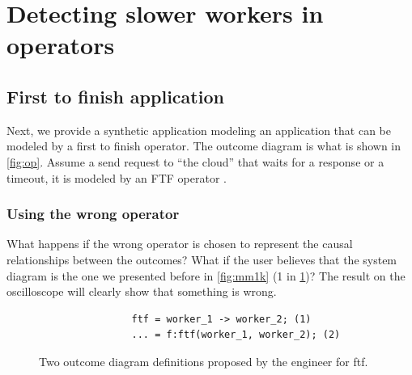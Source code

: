 \section{Detecting slower workers in operators}
    \subsection{First to finish application}
        Next, we provide a synthetic application modeling an application that can be modeled by a first to finish operator. The outcome diagram is what is shown in \cref{fig:op}. Assume a send request to ``the cloud'' that waits for a response or a timeout, it is modeled by an FTF operator \cite{dq-tut}.
       \subsubsection{Using the wrong operator}
            What happens if the wrong operator is chosen to represent the causal relationships between the outcomes? What if the user believes that the system diagram is the one we presented before in \cref{fig:mm1k} (1 in \cref{fig:wrong_od})? The result on the oscilloscope will clearly show that something is wrong.
            \begin{figure}[H]
            \begin{verbatim}
                ftf = worker_1 -> worker_2; (1)
                ... = f:ftf(worker_1, worker_2); (2)
            \end{verbatim}
            \caption{Two outcome diagram definitions proposed by the engineer for ftf.}
                \label{fig:wrong_od}
            \end{figure}

